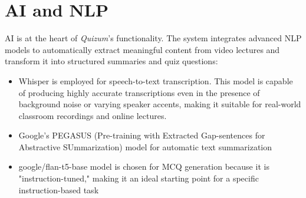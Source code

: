 \section {AI and NLP}
AI is at the heart of \textit{Quizum}’s functionality. The system integrates advanced NLP models to automatically extract meaningful content from video lectures and transform it into structured summaries and quiz questions:
\begin{itemize}
    \item Whisper is employed for speech-to-text transcription. This model is capable of producing highly accurate transcriptions even in the presence of background noise or varying speaker accents, making it suitable for real-world classroom recordings and online lectures.
    \item Google's PEGASUS (Pre-training with Extracted Gap-sentences for Abstractive SUmmarization) model for automatic text summarization
    \item google/flan-t5-base model is chosen for MCQ generation because it is "instruction-tuned," making it an ideal starting point for a specific instruction-based task 
\end{itemize}